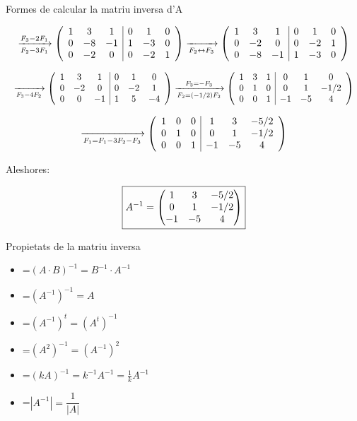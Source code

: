 \documentclass[11pt,a4paper]{article}
\newcommand{\fmm}[1]{\setbox0=\hbox{$#1$}\ifdim\wd0>\linewidth\fmdisp{#1}\else\mbox{\box0}\fi}
\newcommand{\fmdisp}[1]{\[\setbox2=\hbox{$\displaystyle #1$}\ifdim\wd2>\linewidth\resizebox{\linewidth}{!}{\box2}\else\box2\fi\]}
\begin{document}
\begin{fmex}{Formes de calcular la matriu inversa d'A}
\begin{enumerate}[label=\textbf{\arabic*.},leftmargin=*]
\fmdisp{\xrightarrow[F_2-3F_1]{F_3-2F_1}\left(\begin{array}{ccc|ccc}1 & 3 & 1 & 0 & 1 & 0\\ 0 & -8 & -1 & 1 & -3 & 0\\ 0 & -2 & 0 & 0 & -2 & 1\end{array}\right)\xrightarrow[F_2\leftrightarrow F_3]{}\left(\begin{array}{ccc|ccc}1 & 3 & 1 & 0 & 1 & 0\\ 0 & -2 & 0 & 0 & -2 & 1\\ 0 & -8 & -1 & 1 & -3 & 0\end{array}\right)}

\fmdisp{\xrightarrow[F_3-4F_2]{}\left(\begin{array}{ccc|ccc}1 & 3 & 1 & 0 & 1 & 0\\ 0 & -2 & 0 & 0 & -2 & 1\\ 0 & 0 & -1 & 1 & 5 & -4\end{array}\right)\xrightarrow[F_2=(-1/2)F_2]{F_3=-F_3}\left(\begin{array}{ccc|ccc}1 & 3 & 1 & 0 & 1 & 0\\ 0 & 1 & 0 & 0 & 1 & -1/2\\ 0 & 0 & 1 & -1 & -5 & 4\end{array}\right)}

\fmdisp{\xrightarrow[F_1=F_1-3F_2-F_3]{}\left(\begin{array}{ccc|ccc}1 & 0 & 0 & 1 & 3 & -5/2\\ 0 & 1 & 0 & 0 & 1 & -1/2\\ 0 & 0 & 1 & -1 & -5 & 4\end{array}\right)}

Aleshores:

\fmdisp{\boxed{A^{-1}=\begin{pmatrix}1 & 3 & -5/2\\ 0 & 1 & -1/2\\ -1 & -5 & 4\end{pmatrix}}}

\end{enumerate}
\end{fmex}

\begin{fmprop}{Propietats de la matriu inversa}
\begin{multicols}{2}
\begin{itemize}
\item \fmm{(A\cdot B)^{-1}=B^{-1}\cdot A^{-1}}
\item \fmm{(A^{-1})^{-1}=A}
\item \fmm{(A^{-1})^t=(A^t)^{-1}}
\item \fmm{(A^2)^{-1}=(A^{-1})^2}
\item \fmm{(kA)^{-1} = k^{-1}A^{-1}=\frac{1}{k}A^{-1}}
\item \fmm{|A^{-1}|=\dfrac{1}{|A|}}
\end{itemize}
\end{multicols}
\end{fmprop}
\end{document}
